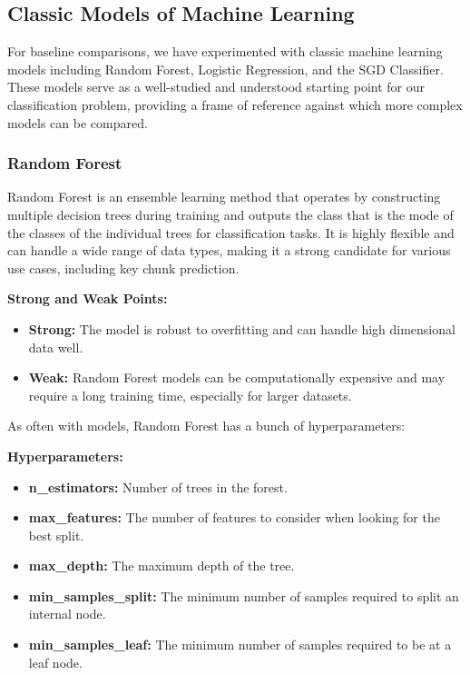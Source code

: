 \subsection{Classic Models of Machine Learning}

For baseline comparisons, we have experimented with classic machine learning models including Random Forest, Logistic Regression, and the SGD Classifier. These models serve as a well-studied and understood starting point for our classification problem, providing a frame of reference against which more complex models can be compared.

\subsubsection{Random Forest}

Random Forest is an ensemble learning method that operates by constructing multiple decision trees during training and outputs the class that is the mode of the classes of the individual trees for classification tasks. It is highly flexible and can handle a wide range of data types, making it a strong candidate for various use cases, including key chunk prediction.

\textbf{Strong and Weak Points:}
\begin{itemize}
  \item \textbf{Strong:} The model is robust to overfitting and can handle high dimensional data well.
  \item \textbf{Weak:} Random Forest models can be computationally expensive and may require a long training time, especially for larger datasets.
\end{itemize}

As often with models, Random Forest has a bunch of hyperparameters:

\textbf{Hyperparameters:}
\begin{itemize}
  \item \textbf{n\_estimators:} Number of trees in the forest.
  \item \textbf{max\_features:} The number of features to consider when looking for the best split.
  \item \textbf{max\_depth:} The maximum depth of the tree.
  \item \textbf{min\_samples\_split:} The minimum number of samples required to split an internal node.
  \item \textbf{min\_samples\_leaf:} The minimum number of samples required to be at a leaf node.
\end{itemize}

